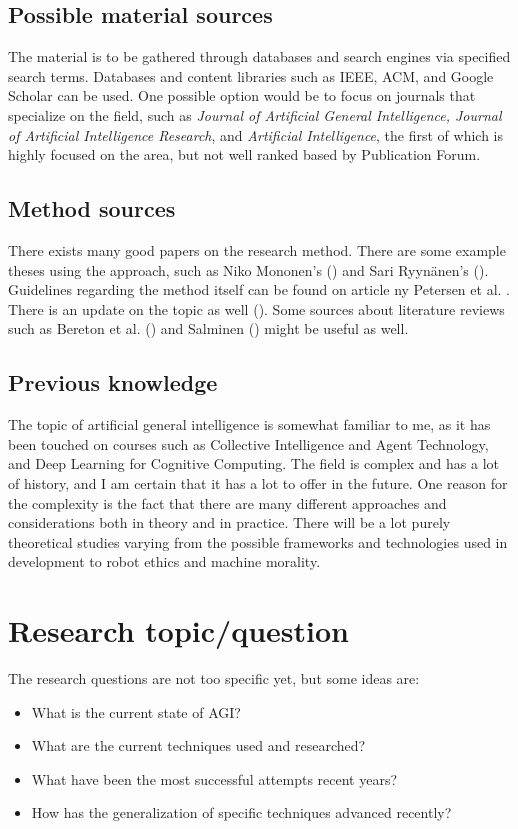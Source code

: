 \documentclass[utf8,english]{gradu3}
\begin{document}
\subsection{Possible material sources}
\label{mat_sources}
The material is to be gathered through databases and search engines via specified search terms. Databases and content libraries such as IEEE, ACM, and Google Scholar can be used. One possible option would be to focus on journals that specialize on the field, such as \textit{Journal of Artificial General Intelligence, Journal of Artificial Intelligence Research}, and \textit{Artificial Intelligence}, the first of which is highly focused on the area, but not well ranked based by Publication Forum. 
\subsection{Method sources}

There exists many good papers on the research method. There are some example theses using the approach, such as Niko Mononen's (\cite{mononen2018}) and Sari Ryynänen's (\cite{ryynanen2017}). Guidelines regarding the method itself can be found on article ny Petersen et al. \cite*{petersen2008}. There is an update on the topic as well (\cite{petersen2015}). Some sources about literature reviews such as Bereton et al. (\cite*{brereton2007}) and Salminen (\cite*{salminen2011}) might be useful as well.

\subsection{Previous knowledge}

The topic of artificial general intelligence is somewhat familiar to me, as it has been touched on courses such as Collective Intelligence and Agent Technology, and Deep Learning for Cognitive Computing. The field is complex and has a lot of history, and I am certain that it has a lot to offer in the future. One reason for the complexity is the fact that there are many different approaches and considerations both in theory and in practice. There will be a lot purely theoretical studies varying from the possible frameworks and technologies used in development to robot ethics and machine morality.


\section{Research topic/question}
The research questions are not too specific yet, but some ideas are:
\begin{itemize}
    \item What is the current state of AGI?
    \item What are the current techniques used and researched?
    \item What have been the most successful attempts recent years?
    \item How has the generalization of specific techniques advanced recently?
\end{itemize}
\end{document}
